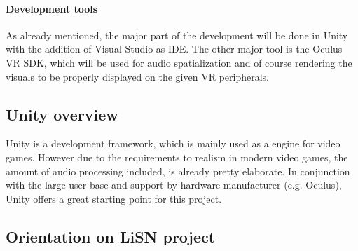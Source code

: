 \documentclass[a4paper,11pt]{article}%
\renewcommand{\\}{\vspace*{0.5\baselineskip} \newline}
\begin{document}



\paragraph{Development tools} As already mentioned, the major part of the development will be done in Unity with the addition of Visual Studio as \ac{IDE}. The other major tool is the Oculus \ac{VR} \ac{SDK}, which will be used for audio spatialization and of course rendering the visuals to be properly displayed on the given \ac{VR} peripherals.



\subsection{Unity overview}
\label{sec:unity}
Unity is a development framework, which is mainly used as a engine for video games. However due to the requirements to realism in modern video games, the amount of audio processing included, is already pretty elaborate. In conjunction with the large user base and support by hardware manufacturer (e.g. Oculus), Unity offers a great starting point for this project.


\subsection{Orientation on LiSN project}
\end{document}
